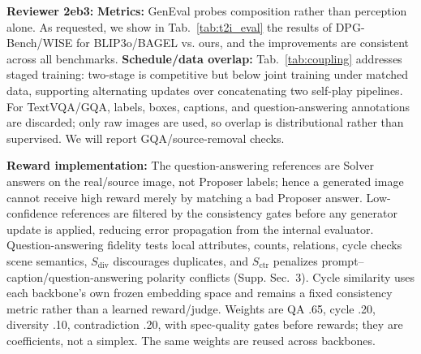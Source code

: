 \documentclass[10pt,twocolumn,letterpaper]{article}
\newcommand{\rTwo}{\textcolor{revtwo}{\textbf{Reviewer 2eb3:}}}
\newcommand{\pt}[1]{\textcolor{pointblue}{\textbf{#1}}}
\begin{document}
\rTwo{} \pt{Metrics:} GenEval probes composition rather than perception alone. As requested, we show in Tab.~\ref{tab:t2i_eval} the results of DPG-Bench/WISE for BLIP3o/BAGEL vs. ours, and the improvements are consistent across all benchmarks. \pt{Schedule/data overlap:} Tab.~\ref{tab:coupling} addresses staged training: two-stage is competitive but below joint training under matched data, supporting alternating updates over concatenating two self-play pipelines. For TextVQA/GQA, labels, boxes, captions, and question-answering annotations are discarded; only raw images are used, so overlap is distributional rather than supervised. We will report GQA/source-removal checks.

\begin{table}
  \centering
  \tiny
  \caption{Broader text-to-image scores, \textbf{Base$\rightarrow$Ours}.}
  \label{tab:t2i_eval}
\end{table}
\pt{Reward implementation:} The question-answering references are Solver answers on the real/source image, not Proposer labels; hence a generated image cannot receive high reward merely by matching a bad Proposer answer. Low-confidence references are filtered by the consistency gates before any generator update is applied, reducing error propagation from the internal evaluator. Question-answering fidelity tests local attributes, counts, relations, cycle checks scene semantics, $S_{\text{div}}$ discourages duplicates, and $S_{\text{ctr}}$ penalizes prompt--caption/question-answering polarity conflicts (Supp. Sec.~3). Cycle similarity uses each backbone's own frozen embedding space and remains a fixed consistency metric rather than a learned reward/judge. Weights are QA .65, cycle .20, diversity .10, contradiction .20, with spec-quality gates before rewards; they are coefficients, not a simplex. The same weights are reused across backbones.
\end{document}
